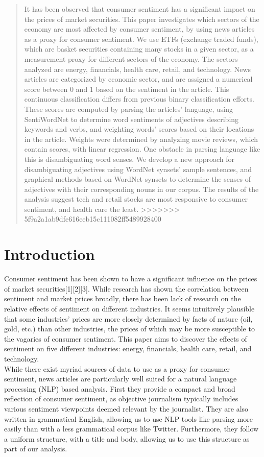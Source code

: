 \documentclass[pageno]{jpaper}
\begin{document}
\begin{abstract}
It has been observed that consumer sentiment has a significant impact on the prices of market securities. This paper investigates which sectors of the economy are most affected by consumer sentiment, by using news articles as a proxy for consumer sentiment. We use ETFs (exchange traded funds), which are basket securities containing many stocks in a given sector, as a measurement proxy for different sectors of the economy. The sectors analyzed are energy, financials, health care, retail, and technology. News articles are categorized by economic sector, and are assigned a numerical score between 0 and 1 based on the sentiment in the article. This continuous classification differs from previous binary classification efforts. These scores are computed by parsing the articles' language, using SentiWordNet to determine word sentiments of adjectives describing keywords and verbs, and weighting words' scores based on their locations in the article. Weights were determined by analyzing movie reviews, which contain scores, with linear regression. One obstacle in parsing language like this is disambiguating word senses. We develop a new approach for disambiguating adjectives using WordNet synsets' sample sentences, and graphical methods based on WordNet synsets to determine the senses of adjectives with their corresponding nouns in our corpus. The results of the analysis suggest tech and retail stocks are most responsive to consumer sentiment, and health care the least.
>>>>>>> 5f9a2a1ab9dfe616eeb15c111082ff5489928400
\end{abstract}

\section{Introduction}

\indent Consumer sentiment has been shown to have a significant influence on the prices of market securities[1][2][3]. While research has shown the correlation between sentiment and market prices broadly, there has been lack of research on the relative effects of sentiment on different industries. It seems intuitively plausible that some industries' prices are more closely determined by facts of nature (oil, gold, etc.) than other industries, the prices of which may be more susceptible to the vagaries of consumer sentiment. This paper aims to discover the effects of sentiment on five different industries: energy, financials, health care, retail, and technology. \\
\indent While there exist myriad sources of data to use as a proxy for consumer sentiment, news articles are particularly well suited for a natural language processing (NLP) based analysis. First they provide a compact and broad reflection of consumer sentiment, as objective journalism typically includes various sentiment viewpoints deemed relevant by the journalist. They are also written in grammatical English, allowing us to use NLP tools like parsing more easily than with a less grammatical corpus like Twitter. Furthermore, they follow a uniform structure, with a title and body, allowing us to use this structure as part of our analysis.
\end{document}
